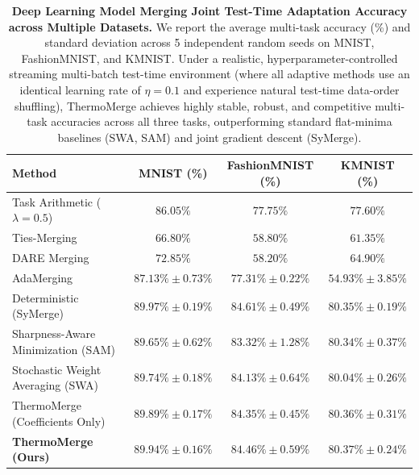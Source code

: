 \begin{table}[t]
\caption{\textbf{Deep Learning Model Merging Joint Test-Time Adaptation Accuracy across Multiple Datasets.} We report the average multi-task accuracy (\%) and standard deviation across 5 independent random seeds on MNIST, FashionMNIST, and KMNIST. Under a realistic, hyperparameter-controlled streaming multi-batch test-time environment (where all adaptive methods use an identical learning rate of $\eta = 0.1$ and experience natural test-time data-order shuffling), ThermoMerge achieves highly stable, robust, and competitive multi-task accuracies across all three tasks, outperforming standard flat-minima baselines (SWA, SAM) and joint gradient descent (SyMerge).}
\label{tab:mnist_results}
\vskip 0.15in
\begin{center}
\begin{small}
\begin{sc}
\begin{tabular}{lccc}
\toprule
Method & MNIST (\%) & FashionMNIST (\%) & KMNIST (\%) \\
\midrule
Task Arithmetic ($\lambda=0.5$) & $86.05\%$ & $77.75\%$ & $77.60\%$ \\
Ties-Merging~\cite{yadav2023ties} & $66.80\%$ & $58.80\%$ & $61.35\%$ \\
DARE Merging~\cite{jin2023dataless} & $72.85\%$ & $58.20\%$ & $64.90\%$ \\
AdaMerging~\cite{yang2024adamerging} & $87.13\% \pm 0.73\%$ & $77.31\% \pm 0.22\%$ & $54.93\% \pm 3.85\%$ \\
Deterministic (SyMerge) & $\mathbf{89.97\% \pm 0.19\%}$ & $\mathbf{84.61\% \pm 0.49\%}$ & $80.35\% \pm 0.19\%$ \\
Sharpness-Aware Minimization (SAM) & $89.65\% \pm 0.62\%$ & $83.32\% \pm 1.28\%$ & $80.34\% \pm 0.37\%$ \\
Stochastic Weight Averaging (SWA) & $89.74\% \pm 0.18\%$ & $84.13\% \pm 0.64\%$ & $80.04\% \pm 0.26\%$ \\
ThermoMerge (Coefficients Only) & $89.89\% \pm 0.17\%$ & $84.35\% \pm 0.45\%$ & $80.36\% \pm 0.31\%$ \\
\textbf{ThermoMerge (Ours)} & $89.94\% \pm 0.16\%$ & $84.46\% \pm 0.59\%$ & $\mathbf{80.37\% \pm 0.24\%}$ \\
\bottomrule
\end{tabular}
\end{sc}
\end{small}
\end{center}
\vskip -0.1in
\end{table}

